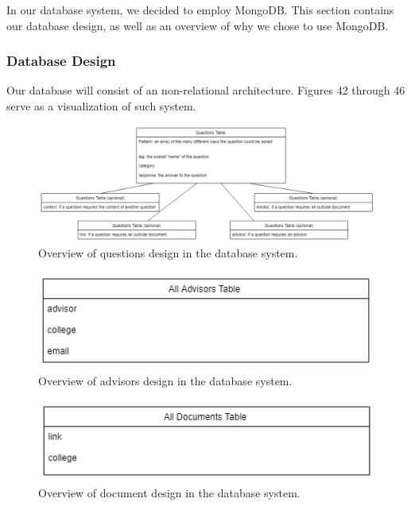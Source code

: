 \documentclass[titlepage, 12pt]{article}
\begin{document}
In our database system, we decided to employ MongoDB. This section contains our database design, as well as an overview of why we chose to use MongoDB.

\subsubsection{Database Design}

Our database will consist of an non-relational architecture. Figures 42 through 46 serve as a visualization of such system.

\begin{figure}[h]
    \centering\includegraphics[width=1\linewidth]{images/system-design/data-questions.png}
    \caption{Overview of questions design in the database system.}
\end{figure}

\begin{figure}[h]
    \centering\includegraphics[width=0.75\linewidth]{images/system-design/data-advisors.png}
    \caption{Overview of advisors design in the database system.}
\end{figure}

\begin{figure}[h]
    \centering\includegraphics[width=0.75\linewidth]{images/system-design/data-documents.png}
    \caption{Overview of document design in the database system.}
\end{figure}
\end{document}
